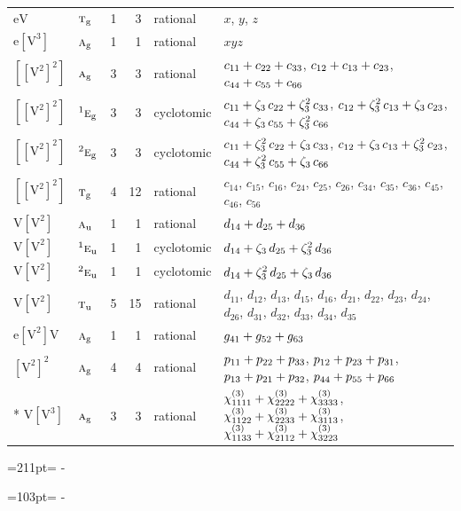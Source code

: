 \documentclass[10pt,a4paper]{article}
\newcommand{\needspace}[1]{\par\penalty-100\begingroup\dimen0=#1\relax\dimen2=\pagegoal
  \advance\dimen2-\pagetotal\ifdim\dimen0>\dimen2\relax\ifdim\dimen2>0pt\vfil\break\fi\fi
  \endgroup}
\numberwithin{equation}{section}
\newcommand{\irr}[1]{\text{\normalfont\scshape #1}}
\newcommand{\conjpair}[1]{{}^{#1}}
\newcommand{\ptag}[1]{\mathrm{#1}}
\newcommand{\rootunity}[1]{\zeta_{#1}}
\newcommand{\jahn}[1]{\mathrm{#1}}
\newlength{\fillwidth}\newlength{\cellwidth}\newlength{\colwidth}
\newcommand{\signbreak}{\penalty100\relax}
\begin{document}
{\begin{longtable}{@{}llrrl>{\RaggedRight\arraybackslash}p{\fillwidth}@{}}
$\jahn{eV}$ & $\irr{t}_{\ptag{g}}$ & 1 & 3 & rational & $x$, $y$, $z$\\
$\jahn{e[V^{3}]}$ & $\irr{a}_{\ptag{g}}$ & 1 & 1 & rational & $xyz$\\
$\jahn{[[V^{2}]^{2}]}$ & $\irr{a}_{\ptag{g}}$ & 3 & 3 & rational & $c_{11} +\signbreak c_{22} +\signbreak c_{33}$, $c_{12} +\signbreak c_{13} +\signbreak c_{23}$, $c_{44} +\signbreak c_{55} +\signbreak c_{66}$\\
$\jahn{[[V^{2}]^{2}]}$ & $\conjpair{1}\irr{e}_{\ptag{g}}$ & 3 & 3 & cyclotomic & $c_{11} +\signbreak \rootunity{3}\,c_{22} +\signbreak \rootunity{3}^{2}\,c_{33}$, $c_{12} +\signbreak \rootunity{3}^{2}\,c_{13} +\signbreak \rootunity{3}\,c_{23}$, $c_{44} +\signbreak \rootunity{3}\,c_{55} +\signbreak \rootunity{3}^{2}\,c_{66}$\\
$\jahn{[[V^{2}]^{2}]}$ & $\conjpair{2}\irr{e}_{\ptag{g}}$ & 3 & 3 & cyclotomic & $c_{11} +\signbreak \rootunity{3}^{2}\,c_{22} +\signbreak \rootunity{3}\,c_{33}$, $c_{12} +\signbreak \rootunity{3}\,c_{13} +\signbreak \rootunity{3}^{2}\,c_{23}$, $c_{44} +\signbreak \rootunity{3}^{2}\,c_{55} +\signbreak \rootunity{3}\,c_{66}$\\
$\jahn{[[V^{2}]^{2}]}$ & $\irr{t}_{\ptag{g}}$ & 4 & 12 & rational & $c_{14}$, $c_{15}$, $c_{16}$, $c_{24}$, $c_{25}$, $c_{26}$, $c_{34}$, $c_{35}$, $c_{36}$, $c_{45}$, $c_{46}$, $c_{56}$\\
$\jahn{V[V^{2}]}$ & $\irr{a}_{\ptag{u}}$ & 1 & 1 & rational & $d_{14} +\signbreak d_{25} +\signbreak d_{36}$\\
$\jahn{V[V^{2}]}$ & $\conjpair{1}\irr{e}_{\ptag{u}}$ & 1 & 1 & cyclotomic & $d_{14} +\signbreak \rootunity{3}\,d_{25} +\signbreak \rootunity{3}^{2}\,d_{36}$\\
$\jahn{V[V^{2}]}$ & $\conjpair{2}\irr{e}_{\ptag{u}}$ & 1 & 1 & cyclotomic & $d_{14} +\signbreak \rootunity{3}^{2}\,d_{25} +\signbreak \rootunity{3}\,d_{36}$\\
$\jahn{V[V^{2}]}$ & $\irr{t}_{\ptag{u}}$ & 5 & 15 & rational & $d_{11}$, $d_{12}$, $d_{13}$, $d_{15}$, $d_{16}$, $d_{21}$, $d_{22}$, $d_{23}$, $d_{24}$, $d_{26}$, $d_{31}$, $d_{32}$, $d_{33}$, $d_{34}$, $d_{35}$\\
$\jahn{e[V^{2}]V}$ & $\irr{a}_{\ptag{g}}$ & 1 & 1 & rational & $\mathnormal{g}_{41} +\signbreak \mathnormal{g}_{52} +\signbreak \mathnormal{g}_{63}$\\
$\jahn{[V^{2}]^{2}}$ & $\irr{a}_{\ptag{g}}$ & 4 & 4 & rational & $p_{11} +\signbreak p_{22} +\signbreak p_{33}$, $p_{12} +\signbreak p_{23} +\signbreak p_{31}$, $p_{13} +\signbreak p_{21} +\signbreak p_{32}$, $p_{44} +\signbreak p_{55} +\signbreak p_{66}$\\*
$\jahn{V[V^{3}]}$ & $\irr{a}_{\ptag{g}}$ & 3 & 3 & rational & $\chi^{(3)}_{1111} +\signbreak \chi^{(3)}_{2222} +\signbreak \chi^{(3)}_{3333}$, $\chi^{(3)}_{1122} +\signbreak \chi^{(3)}_{2233} +\signbreak \chi^{(3)}_{3113}$, $\chi^{(3)}_{1133} +\signbreak \chi^{(3)}_{2112} +\signbreak \chi^{(3)}_{3223}$\\
\bottomrule\end{longtable}}
\needspace{211pt}
\needspace{103pt}
\end{document}
